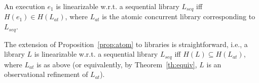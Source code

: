 \begin{proposition}\label{prop:atom}
An execution $e_1$ is linearizable w.r.t. a sequential library $L_{seq}$ iff $H(e_1)\in H(L_{at})$, where $L_{at}$ is the atomic concurrent library corresponding to $L_{seq}$.
\end{proposition}

The extension of Proposition~\ref{prop:atom} to libraries is straightforward, i.e., a library $L$ is linearizable w.r.t. a sequential library $L_{seq}$ iff $H(L)\subseteq H(L_{at})$, where $L_{at}$ is as above (or equivalently, by Theorem~\ref{th:equiv}, $L$ is an observational refinement of $L_{at}$).


